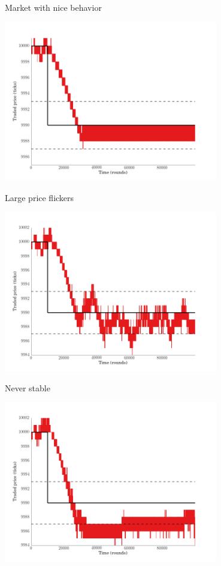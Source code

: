 \documentclass[14pt]{beamer}
\begin{document}
\begin{frame}{Market with nice behavior}
\begin{center}
\includegraphics[width=0.7\textwidth]{market_cases/a_stable_within_margin.png}
\end{center}
\end{frame}

\begin{frame}{Large price flickers}
\begin{center}
\includegraphics[width=0.7\textwidth]{market_cases/b_flicker_but_mostly_within_margin.png}
\end{center}
\end{frame}

\begin{frame}{Never stable}
\begin{center}
\includegraphics[width=0.7\textwidth]{market_cases/c_flickering_on_margin.png}
\end{center}
\end{frame}
\end{document}
